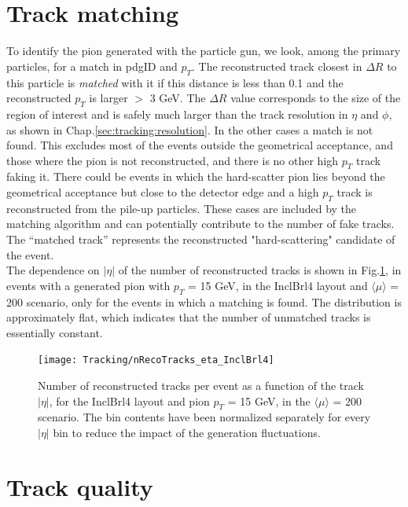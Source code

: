 \documentclass[a4paper,twoside,12pt]{book}
\begin{document}
\section{Track matching}\label{subsec:tracking:matching}
To identify the pion generated with the particle gun, we look, among the primary particles, for a match in pdgID and $p_{T}$. The
reconstructed track closest in $\Delta R$ to this particle is \textit{matched} with it if this distance is less than 0.1 and the reconstructed $p_{T}$ is 
larger $>$ 3 GeV. The $\Delta R$ value corresponds to the size of the 
region of interest and is safely much larger than the track resolution in $\eta$ and $\phi$, as shown in Chap.\ref{sec:tracking:resolution}. In the other cases a match
is not found. This excludes most of the events outside the geometrical acceptance, and those where the pion is not reconstructed, and there is no other 
high $p_{T}$ track faking it. There could be events in which the hard-scatter pion lies beyond the geometrical acceptance but close to the detector edge 
and a high $p_{T}$ track is reconstructed from the pile-up particles. These cases are included by the matching algorithm and can potentially contribute
to the number of fake tracks. The ``matched track''
represents the reconstructed "hard-scattering" candidate of the event.  \\

The dependence on $|\eta|$ of the number of reconstructed tracks is shown
in Fig.\ref{fig:tracking:nRecoTracks_eta}, in events with a generated pion with $p_{T}$ = 15 GeV,
in the InclBrl4 layout and $\langle\mu\rangle$ = 200 scenario, only for the
events in which a matching is found. The distribution is approximately flat, 
which indicates that the number of unmatched tracks is essentially constant.

\begin{figure}
\centering
\texttt{[image: Tracking/nRecoTracks\_eta\_InclBrl4]}
\caption{Number of reconstructed tracks per event as a function of the
track $|\eta|$, for the InclBrl4 layout and pion $p_{T}$ = 15 GeV, in the $\langle\mu\rangle$ = 200 scenario. The bin contents have been normalized separately for every $|\eta|$ bin to
reduce the impact of the generation fluctuations.}
\label{fig:tracking:nRecoTracks_eta}
\end{figure}


\section{Track quality}\label{subsec:tracking:quality}
\end{document}
